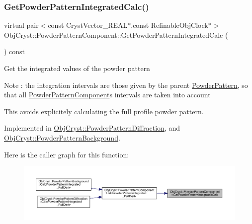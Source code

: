 \subsubsection{\texorpdfstring{GetPowderPatternIntegratedCalc()}{GetPowderPatternIntegratedCalc()}}
{\footnotesize\ttfamily virtual pair$<$const Cryst\+Vector\+\_\+\+R\+E\+AL$\ast$,const Refinable\+Obj\+Clock$\ast$$>$ Obj\+Cryst\+::\+Powder\+Pattern\+Component\+::\+Get\+Powder\+Pattern\+Integrated\+Calc (\begin{DoxyParamCaption}{ }\end{DoxyParamCaption}) const\hspace{0.3cm}{\ttfamily [pure virtual]}}

Get the integrated values of the powder pattern

\begin{DoxyNote}{Note}
\+: the integration intervals are those given by the parent \mbox{\hyperlink{class_obj_cryst_1_1_powder_pattern}{Powder\+Pattern}}, so that all \mbox{\hyperlink{class_obj_cryst_1_1_powder_pattern_component}{Powder\+Pattern\+Component}}\textquotesingle{}s intervals are taken into account
\end{DoxyNote}
This avoids explicitely calculating the full profile powder pattern. 

Implemented in \mbox{\hyperlink{class_obj_cryst_1_1_powder_pattern_diffraction_a2c6ee9bfa4ac1518bd0fcd70cbb5cb72}{Obj\+Cryst\+::\+Powder\+Pattern\+Diffraction}}, and \mbox{\hyperlink{class_obj_cryst_1_1_powder_pattern_background_add12004ddfd2cc22d4fe0c52304da709}{Obj\+Cryst\+::\+Powder\+Pattern\+Background}}.

Here is the caller graph for this function\+:
\nopagebreak
\begin{figure}[H]
\begin{center}
\leavevmode
\includegraphics[width=350pt]{class_obj_cryst_1_1_powder_pattern_component_ac54b7ae5a177492de681afc2cbed72eb_icgraph}
\end{center}
\end{figure}
\mbox{\label{class_obj_cryst_1_1_powder_pattern_component_ae721bd290b50aa9503bac419616a21c6}} 
